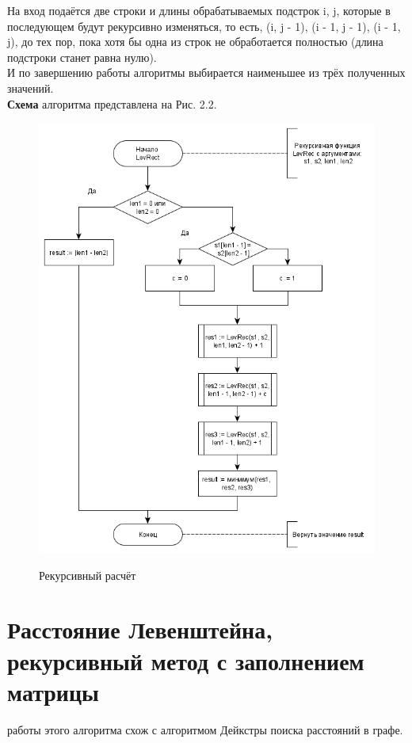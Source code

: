\documentclass[12pt]{report}
\begin{document}
На вход подаётся две строки и длины обрабатываемых подстрок i, j, которые в последующем будут рекурсивно изменяться, то есть, (i, j - 1), (i - 1, j - 1), (i - 1, j), до тех пор, пока хотя бы одна из строк не обработается полностью (длина подстроки станет равна нулю). \\

И по завершению работы алгоритмы выбирается наименьшее из трёх полученных значений. \\

\textbf{Схема} алгоритма представлена на Рис. 2.2.

\begin{figure}[h]
	\begin{center}
		{\includegraphics[scale = 0.75]{LevRec}}
		\caption{Рекурсивный расчёт}
	\end{center}
\end{figure}

\section{Расстояние Левенштейна, рекурсивный метод с заполнением матрицы}
 работы этого алгоритма схож с алгоритмом Дейкстры поиска расстояний в графе. \\
\end{document}
